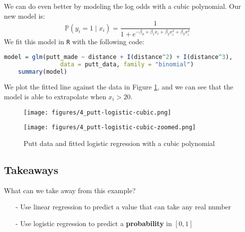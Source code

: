 \documentclass[twoside]{article}
\theoremstyle{definition}
\begin{document}
We can do even better by modeling the log odds with a cubic polynomial. Our new model is:
\begin{equation}
    \mathbb{P}(y_i = 1 \mid x_i) = \frac{1}{1 + e^{-\beta_0 + \beta_1 x_i + \beta_2 x_i^2 + \beta_3 x_i^3}}
\end{equation}
We fit this model in \texttt{R} with the following code:
\begin{lstlisting}[language=R]
    model = glm(putt_made ~ distance + I(distance^2) + I(distance^3),
                data = putt_data, family = "binomial")
    summary(model)
\end{lstlisting}
We plot the fitted line against the data in Figure \ref{fig:putt-logistic-cubic}, and we can see that the model is able to extrapolate when $x_i > 20$.
\begin{figure}[H]
    \centering
    \begin{minipage}{0.48\textwidth}
        \centering
        \texttt{[image: figures/4\_putt-logistic-cubic.png]}
    \end{minipage}
    \hfill
    \begin{minipage}{0.48\textwidth}
        \centering
        \texttt{[image: figures/4\_putt-logistic-cubic-zoomed.png]}
    \end{minipage}
    \caption{Putt data and fitted logistic regression with a cubic polynomial}
    \label{fig:putt-logistic-cubic}
\end{figure}

\subsection{Takeaways}

What can we take away from this example?
\begin{itemize}
    \item[-] Use linear regression to predict a value that can take any real number
    \item[-] Use logistic regression to predict a \textbf{probability} in $[0,1]$
\end{itemize}
\end{document}
